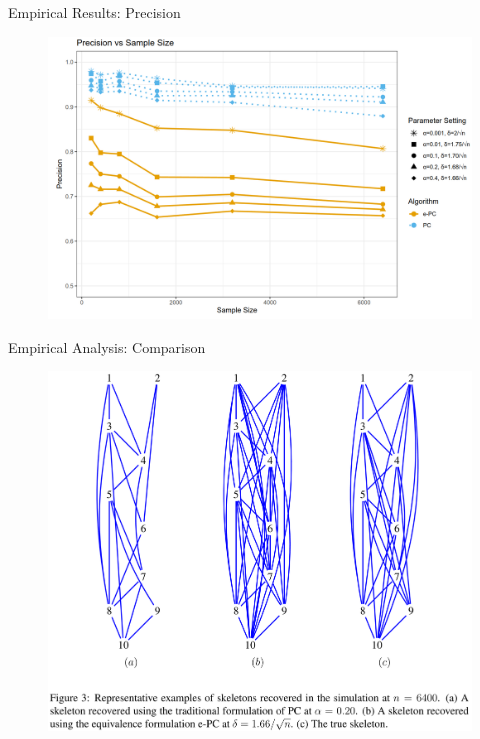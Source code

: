 \documentclass{beamer}
\begin{document}
\begin{frame}{Empirical Results: Precision}
	\begin{figure}
		\centering
		\includegraphics[scale=0.2]{imgs/precision.png}
	\end{figure}
\end{frame}

\begin{frame}{Empirical Analysis: Comparison}
	\begin{figure}
		\centering
		\includegraphics[scale=0.12]{imgs/empirical_compare.png}
	\end{figure}
\end{frame}
\end{document}
